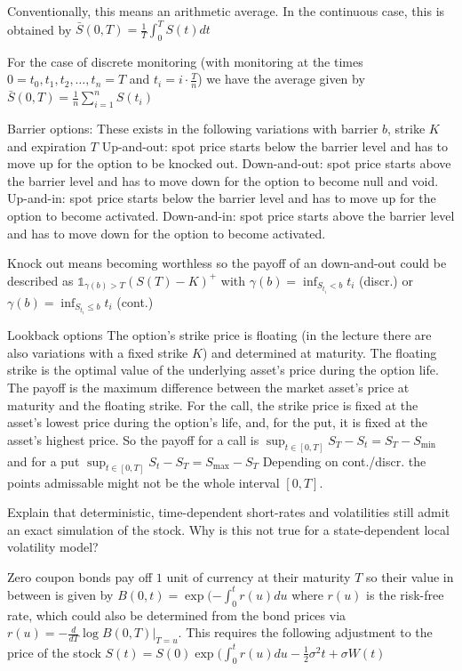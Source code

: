 Conventionally, this means an arithmetic average. In the continuous case, this is obtained by
\( \bar{S}(0,T) = \frac{1}{T} \int_{0}^{T} S(t) dt \)

For the case of discrete monitoring (with monitoring at the times \( 0=t_0, t_1, t_2, \dots, t_n=T \) and \( t_i=i\cdot \frac{T}{n} \))  we have the average given by
\( \bar{S}(0,T) = \frac{1}{n} \sum_{i=1}^{n} S(t_i) \)

Barrier options:
These exists in the following variations with barrier \( b \), strike \( K \) and expiration \( T \)
Up-and-out: spot price starts below the barrier level and has to move up for the option to be knocked out.
Down-and-out: spot price starts above the barrier level and has to move down for the option to become null and void.
Up-and-in: spot price starts below the barrier level and has to move up for the option to become activated.
Down-and-in: spot price starts above the barrier level and has to move down for the option to become activated.

Knock out means becoming worthless
so the payoff of an down-and-out could be described as 
\( \mathbb{1}_{\gamma(b) > T}(S(T) - K)^{+} \)
with \( \gamma(b) = \inf_{S_{t_i} < b} t_i \) (discr.)
or \( \gamma(b) = \inf_{S_{t_i} \leq b} t_i \) (cont.)

Lookback options
The option's strike price is floating (in the lecture there are also variations with a fixed strike \( K \))
and determined at maturity. 
The floating strike is the optimal value of the underlying asset's price during the option life. 
The payoff is the maximum difference between the market asset's price at maturity and the floating strike. 
For the call, the strike price is fixed at the asset's lowest price during the option's life, and, for the put, 
it is fixed at the asset's highest price.
So the payoff for a call is
\( \sup_{t \in [0, T]} S_T - S_t = S_T - S_{\text{min}}\)
and for a put
\( \sup_{t \in [0, T]} S_t - S_T  = S_{\text{max}} - S_T \)
Depending on cont./discr. the points admissable might not be the whole interval \( [0, T] \).

Explain that deterministic, time-dependent short-rates and volatilities still admit
an exact simulation of the stock. Why is this not true for a state-dependent local
volatility model?

Zero coupon bonds pay off \( 1 \) unit of currency at their maturity \( T \)
so their value in between is given by \( B(0, t) = \exp(-\int_{0}^{t} r(u)du \)
where \( r(u) \) is the risk-free rate, which could also be determined from
the bond prices via \( r(u) = -\frac{d}{dT}\log B(0, T)|_{T=u} \).
This requires the following adjustment to the price of the stock
\( S(t) = S(0)\exp(\int_{0}^t r(u)du - \frac{1}{2}\sigma^2 t + \sigma W(t) \)

